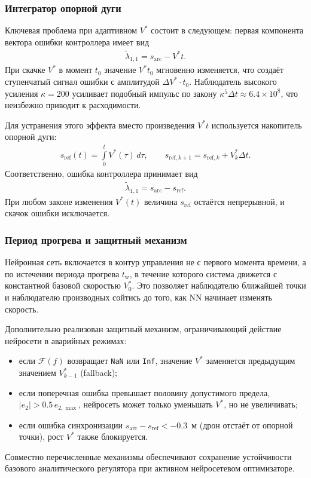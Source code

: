 \subsubsection{Интегратор опорной дуги}

Ключевая проблема при адаптивном $V^{\ast}$ состоит в следующем: первая компонента вектора ошибки контроллера имеет вид
\begin{gather}
    \tilde{\lambda}_{1,1} = s_{\mathrm{arc}} - V^{\ast} t.
\end{gather}
При скачке $V^{\ast}$ в момент $t_0$ значение $V^{\ast} t_0$ мгновенно изменяется, что создаёт ступенчатый сигнал ошибки с амплитудой $\Delta V^{\ast} \cdot t_0$.
Наблюдатель высокого усиления $\kappa = 200$ усиливает подобный импульс по закону $\kappa^5 \Delta t \approx 6.4 \times 10^8$, что неизбежно приводит к расходимости.

Для устранения этого эффекта вместо произведения $V^{\ast} t$ используется накопитель опорной дуги:
\begin{gather}
    s_{\mathrm{ref}}(t) = \int\limits_{0}^{t} V^{\ast}(\tau)\, d\tau, \qquad
    s_{\mathrm{ref},k+1} = s_{\mathrm{ref},k} + V^{\ast}_k \Delta t.
\end{gather}
Соответственно, ошибка контроллера принимает вид
\begin{gather}
    \tilde{\lambda}_{1,1} = s_{\mathrm{arc}} - s_{\mathrm{ref}}.
\end{gather}
При любом законе изменения $V^{\ast}(t)$ величина $s_{\mathrm{ref}}$ остаётся непрерывной, и скачок ошибки исключается.

\subsubsection{Период прогрева и защитный механизм}

Нейронная сеть включается в контур управления не с первого момента времени, а по истечении периода прогрева $t_{\mathrm{w}}$, в течение которого система движется с константной базовой скоростью $V^{\ast}_0$. Это позволяет наблюдателю ближайшей точки и наблюдателю производных сойтись до того, как NN начинает изменять скорость.

Дополнительно реализован защитный механизм, ограничивающий действие нейросети в аварийных режимах:
\begin{itemize}
    \item если $\mathcal{F}(f)$ возвращает \texttt{NaN} или \texttt{Inf}, значение $V^{\ast}$ заменяется предыдущим значением $V^{\ast}_{k-1}$ (fallback);
    \item если поперечная ошибка превышает половину допустимого предела, $|e_2| > 0.5\, e_{2,\max}$, нейросеть может только уменьшать $V^{\ast}$, но не увеличивать;
    \item если ошибка синхронизации $s_{\mathrm{arc}} - s_{\mathrm{ref}} < -0.3$~м (дрон отстаёт от опорной точки), рост $V^{\ast}$ также блокируется.
\end{itemize}
Совместно перечисленные механизмы обеспечивают сохранение устойчивости базового аналитического регулятора при активном нейросетевом оптимизаторе.


